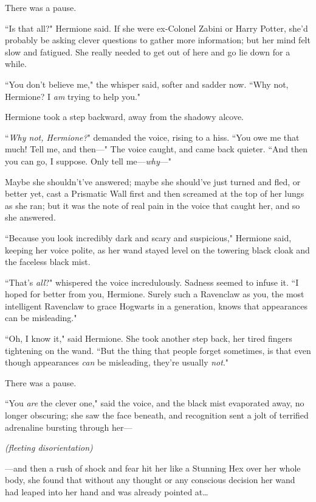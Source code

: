 There was a pause.

``Is that all?" Hermione said. If she were ex-Colonel Zabini or Harry Potter, she'd probably be asking clever questions to gather more information; but her mind felt slow and fatigued. She really needed to get out of here and go lie down for a while.

``You don't believe me," the whisper said, softer and sadder now. ``Why not, Hermione? I \emph{am} trying to help you."

Hermione took a step backward, away from the shadowy alcove.

``\emph{Why not, Hermione?}" demanded the voice, rising to a hiss. ``You owe me that much! Tell me, and then---" The voice caught, and came back quieter. ``And then you can go, I suppose. Only tell me---\emph{why}---"

Maybe she shouldn't've answered; maybe she should've just turned and fled, or better yet, cast a Prismatic Wall first and then screamed at the top of her lungs as she ran; but it was the note of real pain in the voice that caught her, and so she answered.

``Because you look incredibly dark and scary and suspicious," Hermione said, keeping her voice polite, as her wand stayed level on the towering black cloak and the faceless black mist.

``That's \emph{all}?" whispered the voice incredulously. Sadness seemed to infuse it. ``I hoped for better from you, Hermione. Surely such a Ravenclaw as you, the most intelligent Ravenclaw to grace Hogwarts in a generation, knows that appearances can be misleading."

``Oh, I know it," said Hermione. She took another step back, her tired fingers tightening on the wand. ``But the thing that people forget sometimes, is that even though appearances \emph{can} be misleading, they're usually \emph{not}."

There was a pause.

``You \emph{are} the clever one," said the voice, and the black mist evaporated away, no longer obscuring; she saw the face beneath, and recognition sent a jolt of terrified adrenaline bursting through her---

\emph{(fleeting disorientation)}

---and then a rush of shock and fear hit her like a Stunning Hex over her whole body, she found that without any thought or any conscious decision her wand had leaped into her hand and was already pointed at{\ldots}

